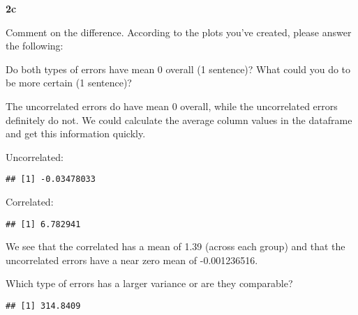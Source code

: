 \documentclass[
]{article}
\newenvironment{Shaded}{\begin{snugshade}}{\end{snugshade}}
\newcommand{\FunctionTok}[1]{\textcolor[rgb]{0.00,0.00,0.00}{#1}}
\newcommand{\NormalTok}[1]{#1}
\newcommand{\SpecialCharTok}[1]{\textcolor[rgb]{0.00,0.00,0.00}{#1}}
\begin{document}
\textbf{2c}

Comment on the difference. According to the plots you've created, please
answer the following:

Do both types of errors have mean 0 overall (1 sentence)? What could you
do to be more certain (1 sentence)?

The uncorrelated errors do have mean 0 overall, while the uncorrelated
errors definitely do not. We could calculate the average column values
in the dataframe and get this information quickly.

Uncorrelated:

\begin{Shaded}
\end{Shaded}

\begin{verbatim}
## [1] -0.03478033
\end{verbatim}

Correlated:

\begin{Shaded}
\end{Shaded}

\begin{verbatim}
## [1] 6.782941
\end{verbatim}

We see that the correlated has a mean of 1.39 (across each group) and
that the uncorrelated errors have a near zero mean of -0.001236516.

Which type of errors has a larger variance or are they comparable?

\begin{Shaded}
\end{Shaded}

\begin{verbatim}
## [1] 314.8409
\end{verbatim}

\begin{Shaded}
\end{Shaded}
\end{document}
